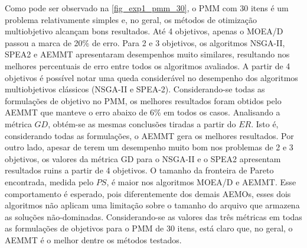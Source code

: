 Como pode ser observado na \autoref{fig_exp1_pmm_30}, o PMM com 30 itens é um problema relativamente simples e, no geral, os métodos de otimização multiobjetivo alcançam bons resultados. Até 4 objetivos, apenas o MOEA/D passou a marca de 20\% de erro. Para 2 e 3 objetivos, os algoritmos NSGA-II, SPEA2 e AEMMT apresentaram desempenhos muito similares, resultando nos melhores percentuais de erro entre todos os algoritmos avaliados. A partir de 4 objetivos é possível notar uma queda considerável no desempenho dos algoritmos multiobjetivos clássicos (NSGA-II e SPEA-2). Considerando-se todas as formulações de objetivo no PMM, os melhores resultados foram obtidos pelo AEMMT que manteve o erro abaixo de 6\% em todos os casos. Analisando a métrica $GD$, obtém-se as mesmas conclusões tiradas a partir do $ER$. Isto é, considerando todas as formulações, o AEMMT gera os melhores resultados. Por outro lado, apesar de terem um desempenho muito bom nos problemas de 2 e 3 objetivos, os valores da métrica GD para o NSGA-II e o SPEA2 apresentam resultados ruins a partir de 4 objetivos. O tamanho da fronteira de Pareto encontrada, medida pelo $PS$, é maior nos algoritmos MOEA/D e AEMMT. Esse comportamento é esperado, pois diferentemente dos demais AEMOs, esses dois algoritmos não aplicam uma limitação sobre o tamanho do arquivo que armazena as soluções não-dominadas. Considerando-se as valores das três métricas em todas as formulações de objetivos para o PMM de 30 itens, está claro que, no geral, o AEMMT é o melhor dentre os métodos testados.

